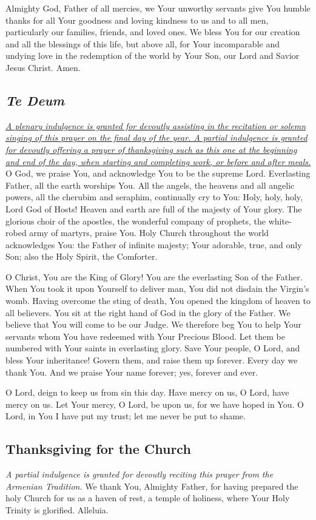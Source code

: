 \documentclass[12pt]{article}
\newcommand{\prayertitle}[1]{\subsection{#1}}
\newcommand{\indulgencedprayertitle}[1]{\prayertitle{#1 \protect\kreuz}}
\newcommand{\foreign}[1]{\textsl{#1}}
\newcommand{\note}[1]{{\small{\textsl{#1}}}\newline}
\newcommand{\linkednote}[2]{\hyperlink{#1}{\note{#2}}}
\begin{document}
Almighty God, Father of all mercies, we Your unworthy servants give You humble thanks for all Your goodness and loving kindness to us and to all men, particularly our families, friends, and loved ones.
We bless You for our creation and all the blessings of this life, but above all, for Your incomparable and undying love in the redemption of the world by Your Son, our Lord and Savior Jesus Christ.
Amen.
\newpage
\indulgencedprayertitle{\foreign{Te Deum}}
\linkednote{grant26}{A plenary indulgence is granted for devoutly assisting in the recitation or solemn singing of this prayer on the final day of the year.
A partial indulgence is granted for devoutly offering a prayer of thanksgiving such as this one at the beginning and end of the day, when starting and completing work, or before and after meals.}
O God, we praise You, and acknowledge You to be the supreme Lord.
Everlasting Father, all the earth worships You.
All the angels, the heavens and all angelic powers, all the cherubim and seraphim, continually cry to You:
Holy, holy, holy, Lord God of Hosts!
Heaven and earth are full of the majesty of Your glory.
The glorious choir of the apostles, the wonderful company of prophets, the white-robed army of martyrs, praise You.
Holy Church throughout the world acknowledges You:
the Father of infinite majesty;
Your adorable, true, and only Son;
also the Holy Spirit, the Comforter.

O Christ, You are the King of Glory!
You are the everlasting Son of the Father.
When You took it upon Yourself to deliver man, You did not disdain the Virgin's womb.
Having overcome the sting of death, You opened the kingdom of heaven to all believers.
You sit at the right hand of God in the glory of the Father.
We believe that You will come to be our Judge.
We therefore beg You to help Your servants whom You have redeemed with Your Precious Blood.
Let them be numbered with Your saints in everlasting glory.
Save Your people, O Lord, and bless Your inheritance!
Govern them, and raise them up forever.
Every day we thank You.
And we praise Your name forever;
yes, forever and ever.

O Lord, deign to keep us from sin this day.
Have mercy on us, O Lord, have mercy on us.
Let Your mercy, O Lord, be upon us, for we have hoped in You.
O Lord, in You I have put my trust;
let me never be put to shame.

\indulgencedprayertitle{Thanksgiving for the Church}
\note{A partial indulgence is granted for devoutly reciting this prayer from the Armenian Tradition.}
We thank You, Almighty Father, for having prepared the holy Church for us as a haven
of rest, a temple of holiness, where Your Holy Trinity is glorified. Alleluia.
\end{document}
